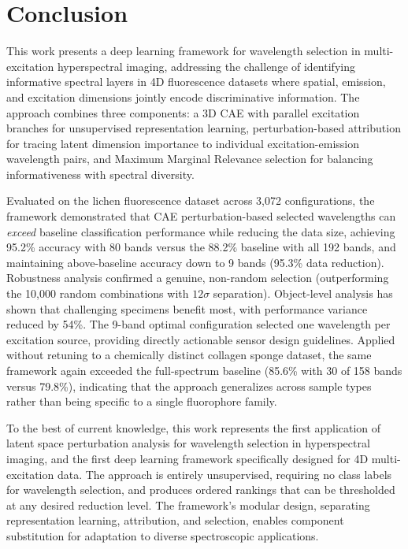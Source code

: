 \section{Conclusion}
\label{sec:conclusion}

This work presents a deep learning framework for wavelength selection in multi-excitation hyperspectral imaging, addressing the challenge of identifying informative spectral layers in 4D fluorescence datasets where spatial, emission, and excitation dimensions jointly encode discriminative information.
The approach combines three components: a 3D CAE with parallel excitation branches for unsupervised representation learning, perturbation-based attribution for tracing latent dimension importance to individual excitation-emission wavelength pairs, and Maximum Marginal Relevance selection for balancing informativeness with spectral diversity.

Evaluated on the lichen fluorescence dataset across 3,072 configurations, the framework demonstrated that CAE perturbation-based selected wavelengths can \emph{exceed} baseline classification performance while reducing the data size, achieving 95.2\% accuracy with 80 bands versus the 88.2\% baseline with all 192 bands, and maintaining above-baseline accuracy down to 9 bands (95.3\% data reduction).
Robustness analysis confirmed a genuine, non-random selection (outperforming the 10,000 random combinations with $12\sigma$ separation). Object-level analysis has shown that challenging specimens benefit most, with performance variance reduced by 54\%.
The 9-band optimal configuration selected one wavelength per excitation source, providing directly actionable sensor design guidelines.
Applied without retuning to a chemically distinct collagen sponge dataset, the same framework again exceeded the full-spectrum baseline (85.6\% with 30 of 158 bands versus 79.8\%), indicating that the approach generalizes across sample types rather than being specific to a single fluorophore family.

To the best of current knowledge, this work represents the first application of latent space perturbation analysis for wavelength selection in hyperspectral imaging, and the first deep learning framework specifically designed for 4D multi-excitation data.
The approach is entirely unsupervised, requiring no class labels for wavelength selection, and produces ordered rankings that can be thresholded at any desired reduction level.
The framework's modular design, separating representation learning, attribution, and selection, enables component substitution for adaptation to diverse spectroscopic applications.

